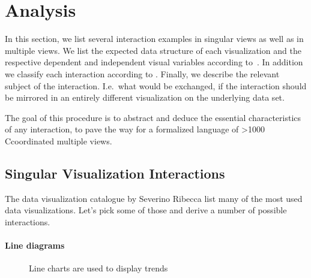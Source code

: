 \documentclass{article}
\newcommand\hmm[1]{\ifnum\ifhmode\spacefactor\else2000\fi>1000 \uppercase{#1}\else#1\fi}
\newcommand{\cmvs}{\hmm{c}oordinated multiple views}
\begin{document}
\clearpage
\section{Analysis}\label{sec:analysis}
In this section, we list several interaction examples in singular views as well as in multiple views.
We list the expected data structure of each visualization and the respective dependent and independent visual variables according to~\cite{Bertin2010}.
In addition we classify each interaction according to \textcite{Yi2007}.
Finally, we describe the relevant subject of the interaction.
I.e.\ what would be exchanged, if the interaction should be mirrored in an entirely different visualization on the underlying data set.

The goal of this procedure is to abstract and deduce the essential characteristics of any interaction, to pave the way for a formalized language of \cmvs{}.

\subsection{Singular Visualization Interactions}\label{sec:analysis:examples}

The data visualization catalogue by Severino Ribecca list many of the most used data visualizations\cite{VisualizationCatalogue2017}.
Let's pick some of those and derive a number of possible interactions.



\paragraph{Line diagrams}
\begin{figure}
  \begin{center}
    \qquad
  \end{center}
  \caption{Line charts are used to display trends}\label{fig:concept:chart-types:line-diagrams}
\end{figure}
\end{document}

